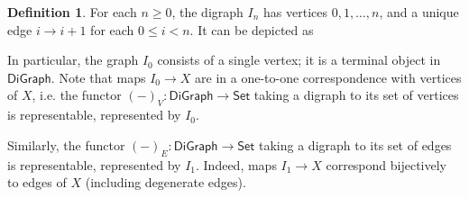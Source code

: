 \documentclass[11pt]{article}
\theoremstyle{definition}
\newtheorem{defi}[theo]{Definition}
\numberwithin{equation}{section}
\newcommand{\Set}{\mathsf{Set}}
\newcommand{\DiGraph}{\mathsf{DiGraph}}
\begin{document}
\begin{defi}\label{def:I_n}
    For each $n\geq 0$, the digraph $I_n$ has vertices $0,1,\dots, n$, and a unique edge $i\to i+1$ for each $0\leq i<n$. It can be depicted as

    \begin{figure}[H]
    \centering
    \end{figure}
\end{defi}

In particular, the graph $I_0$ consists of a single vertex; it is a terminal object in $\DiGraph$.
Note that maps $I_0 \to X$ are in a one-to-one correspondence with vertices of $X$, i.e. the functor $(-)_V \colon \DiGraph \to \Set$ taking a digraph to its set of vertices is representable, represented by $I_0$.

Similarly, the functor $(-)_E \colon \DiGraph \to \Set$ taking a digraph to its set of edges is representable, represented by $I_1$.
Indeed, maps $I_1 \to X$ correspond bijectively to edges of $X$ (including degenerate edges).
\end{document}

